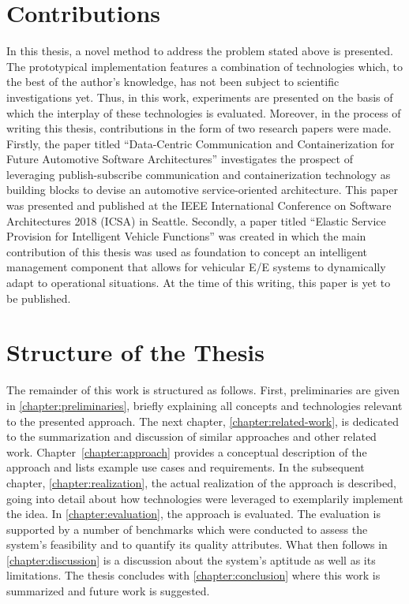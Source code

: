 \section{Contributions}
In this thesis, a novel method to address the problem stated above is presented. The prototypical implementation features a combination of technologies which, to the best of the author's knowledge, has not been subject to scientific investigations yet. Thus, in this work, experiments are presented on the basis of which the interplay of these technologies is evaluated.
Moreover, in the process of writing this thesis, contributions in the form of two research papers were made. 
Firstly, the paper titled ``Data-Centric Communication and Containerization for Future Automotive Software Architectures'' \cite{kugele:hettler:peter:icsa18} investigates the prospect of leveraging publish-subscribe communication and containerization technology as building blocks to devise an automotive service-oriented architecture. This paper was presented and published at the IEEE International Conference on Software Architectures 2018 (ICSA) in Seattle. 
Secondly, a paper titled ``Elastic Service Provision for Intelligent Vehicle Functions'' \cite{kugele:hettler:itsc} was created in which the main contribution of this thesis was used as foundation to concept an intelligent management component that allows for vehicular E/E systems to dynamically adapt to operational situations. At the time of this writing, this paper is yet to be published.
%
%
%
%
%
%
%
%
%
%
\section{Structure of the Thesis}
The remainder of this work is structured as follows. First, preliminaries are given in \autoref{chapter:preliminaries}, briefly explaining all concepts and technologies relevant to the presented approach. The next chapter, \autoref{chapter:related-work}, is dedicated to the summarization and discussion of similar approaches and other related work. Chapter~\ref{chapter:approach} provides a conceptual description of the approach and lists example use cases and requirements. In the subsequent chapter, \autoref{chapter:realization}, the actual realization of the approach is described, going into detail about how technologies were leveraged to exemplarily implement the idea. In \autoref{chapter:evaluation}, the approach is evaluated. The evaluation is supported by a number of benchmarks which were conducted to assess the system's feasibility and to quantify its quality attributes. What then follows in \autoref{chapter:discussion} is a discussion about the system's aptitude as well as its limitations. The thesis concludes with \autoref{chapter:conclusion} where this work is summarized and future work is suggested.

%
%
%
%
%
%
%
%
%
%
%
%
%
%
%
%
%
%
%
%
%
%
%
%
%
%
%
%
%
%
%
%
%
%
%
%
%
%

